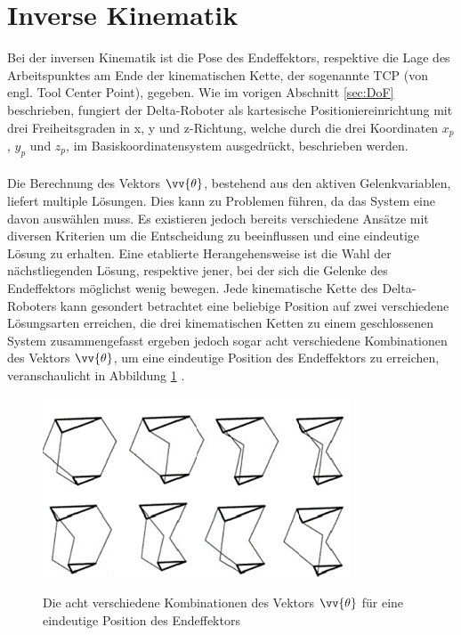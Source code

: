 \documentclass[Bachelor, BMR, ngerman]{twbook}
\begin{document}
    
    \section{Inverse Kinematik} %
    
    Bei der inversen Kinematik ist die Pose des Endeffektors, respektive die Lage des Arbeitspunktes am Ende der kinematischen Kette, der sogenannte TCP (von engl. Tool Center Point), gegeben. Wie im vorigen Abschnitt \ref{sec:DoF} beschrieben, fungiert der Delta-Roboter als kartesische Positioniereinrichtung mit drei Freiheitsgraden in x, y und z-Richtung, welche durch die drei Koordinaten $x_p$, $y_p$ und $z_p$, im Basiskoordinatensystem ausgedrückt, beschrieben werden.\\
    \\
    Die Berechnung des Vektors $\vv{\theta}$, bestehend aus den aktiven Gelenkvariablen, liefert multiple Lösungen. Dies kann zu Problemen führen, da das System eine davon auswählen muss. Es existieren jedoch bereits verschiedene Ansätze mit diversen Kriterien um die Entscheidung zu beeinflussen und eine eindeutige Lösung zu erhalten. Eine etablierte Herangehensweise ist die Wahl der nächstliegenden Lösung, respektive jener, bei der sich die Gelenke des Endeffektors möglichst wenig bewegen. Jede kinematische Kette des Delta-Roboters kann gesondert betrachtet eine beliebige Position auf zwei verschiedene Lösungsarten erreichen, die drei kinematischen Ketten zu einem geschlossenen System zusammengefasst ergeben jedoch sogar acht verschiedene Kombinationen des Vektors $\vv{\theta}$, um eine eindeutige Position des Endeffektors zu erreichen, veranschaulicht in Abbildung \ref{fig:delta-zielpositionen} \cite{KaPo16}.
    \begin{figure}[H]
      \centering
      {
        \includegraphics[width=0.5\linewidth]{delta-goalpositions.png}
      }
      \caption[Die acht verschiedene Kombinationen des Vektors $\protect\vv{\theta}$ für eine eindeutige Position des Endeffektors ]{Die acht verschiedene Kombinationen des Vektors $\protect\vv{\theta}$ für eine eindeutige Position des Endeffektors }
      \label{fig:delta-zielpositionen}
    \end{figure}
\end{document}
